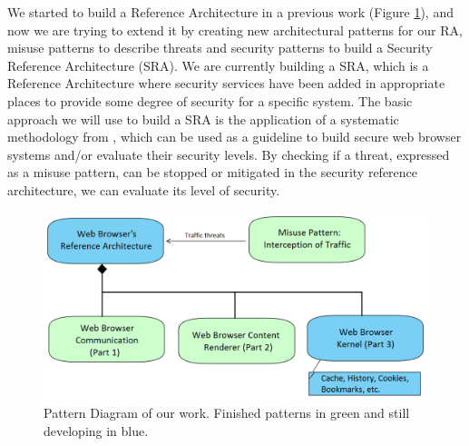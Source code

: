 \documentclass[prodmode,acmtecs]{acmsmall}
\begin{document}
We started to build a Reference Architecture in a previous work (Figure \ref{fig:relations}), and now we are trying to extend it by creating new architectural patterns for our RA, misuse patterns to describe threats and security patterns to build a Security Reference Architecture (SRA). We are currently building a SRA, which is a Reference Architecture where security services have been added in appropriate places to provide some degree of security for a specific system. The basic approach we will use to build a SRA is the application of a systematic methodology from \cite{fernandez2006methodology,Fernandez2011,Fernandez2016}, which can be used as a guideline to build secure web browser systems and/or evaluate their security levels. By checking if a threat, expressed as a misuse pattern, can be stopped or mitigated in the security reference architecture, we can evaluate its level of security.

    \begin{figure}[h!t]
      \centering
      \hspace{0.5cm}\includegraphics[scale=0.43]{figures/relations-finish.png}
      \vspace*{0.5cm}
      \caption{Pattern Diagram of our work. Finished patterns in green and still developing in blue.}
      \label{fig:relations}
    \end{figure}
\end{document}
